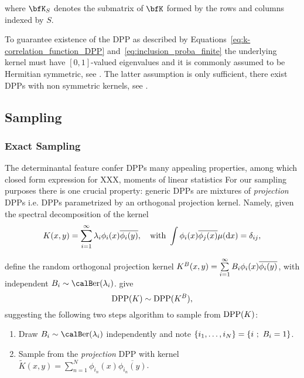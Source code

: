 \documentclass[twoside,11pt]{article}
\begin{document}
    where $\bfK_S$ denotes the submatrix of $\bfK$ formed by the rows and columns indexed by $S$.

    To guarantee existence of the DPP as described by Equations~\ref{eq:k-correlation_function_DPP} and~\ref{eq:inclusion_proba_finite} the underlying kernel must have $[0,1]$-valued eigenvalues and it is commonly assumed to be Hermitian symmetric, see \citep[Theorem 3]{Sos00}.
    The latter assumption is only sufficient, there exist DPPs with non symmetric kernels, see \citep{BoDiFu09}.

  \subsection{Sampling} %
  \label{sub:sampling}

    \subsubsection{Exact Sampling} %
    \label{ssub:exact_sampling}

      The determinantal feature confer DPPs many appealing properties, among which closed form expression for XXX, moments of linear statistics \etc
      For our sampling purposes there is one crucial property: generic DPPs are mixtures of \textit{projection} DPPs i.e. DPPs parametrized by an orthogonal projection kernel.
      Namely, given the spectral decomposition of the kernel
      \begin{equation}
      \label{eq:eigdec_kernel}
        K(x,y)=\sum\limits_{i=1}^{\infty} \lambda_i \phi_i(x) \overline{\phi_i(y)},
        \quad \text{with }
        \int \phi_i(x) \overline{\phi_j(x)} \mu(\mathop{}\!\mathrm{d} x) = \delta_{ij},
      \end{equation}

      define the random orthogonal projection kernel
      $
        K^B(x,y)
          = \sum\limits_{i=1}^{\infty} B_i \phi_i(x) \overline{\phi_i(y)}
      $, with independent $B_i\sim\Ber(\lambda_i)$.
      \citet[Theorem 7]{HKPV06} give
      \begin{equation}
        \operatorname{DPP}(K) \sim \operatorname{DPP}(K^B),
      \end{equation}
      suggesting the following two steps algorithm to sample from $\operatorname{DPP}(K)$:
      \begin{enumerate}
        \item Draw $B_i\sim\Ber(\lambda_i)$ independently and note $\left\{ i_1,\dots,i_{N} \right\} = \left\{ i~;~B_i=1 \right\}$.
        \item Sample from the \textit{projection} DPP with kernel $\tilde{K}(x,y) = \sum_{n=1}^{N}\phi_{i_n}(x) \overline{\phi_{i_n}(y)}$.
      \end{enumerate}
\end{document}
